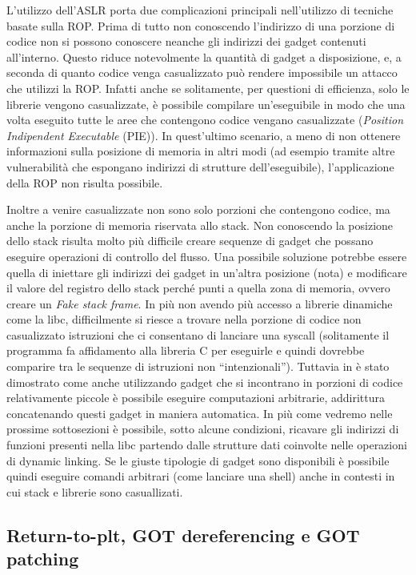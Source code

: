 L'utilizzo dell'ASLR porta due complicazioni principali nell'utilizzo
di tecniche basate sulla ROP. Prima di tutto non conoscendo
l'indirizzo di una porzione di codice non si possono conoscere neanche
gli indirizzi dei gadget contenuti all'interno. Questo riduce
notevolmente la quantità di gadget a disposizione, e, a seconda di
quanto codice venga casualizzato può rendere impossibile un attacco
che utilizzi la ROP. Infatti anche se solitamente, per questioni di
efficienza, solo le librerie vengono casualizzate, è possibile
compilare un'eseguibile in modo che una volta eseguito tutte le aree
che contengono codice vengano casualizzate (\emph{Position Indipendent
  Executable} (PIE)). In quest'ultimo scenario, a meno di non ottenere
informazioni sulla posizione di memoria in altri modi (ad esempio
tramite altre vulnerabilità che espongano indirizzi di strutture
dell'eseguibile), l'applicazione della ROP non risulta possibile.

Inoltre a venire casualizzate non sono solo porzioni che contengono
codice, ma anche la porzione di memoria riservata allo stack. Non
conoscendo la posizione dello stack risulta molto più difficile creare
sequenze di gadget che possano eseguire operazioni di controllo del
flusso. Una possibile soluzione potrebbe essere quella di iniettare
gli indirizzi dei gadget in un'altra posizione (nota) e modificare il
valore del registro dello stack perché punti a quella zona di memoria,
ovvero creare un \emph{Fake stack frame}. In più non avendo più
accesso a librerie dinamiche come la libc, difficilmente si riesce a
trovare nella porzione di codice non casualizzato istruzioni che ci
consentano di lanciare una syscall (solitamente il programma fa
affidamento alla libreria C per eseguirle e quindi dovrebbe comparire
tra le sequenze di istruzioni non ``intenzionali''). Tuttavia in
\cite{schwartz-2011} è stato dimostrato come anche utilizzando gadget che si
incontrano in porzioni di codice relativamente piccole è possibile
eseguire computazioni arbitrarie, addirittura concatenando questi
gadget in maniera automatica. In più come vedremo nelle prossime
sottosezioni è possibile, sotto alcune condizioni, ricavare gli
indirizzi di funzioni presenti nella libc partendo dalle strutture
dati coinvolte nelle operazioni di dynamic linking. Se le giuste
tipologie di gadget sono disponibili è possibile quindi eseguire
comandi arbitrari (come lanciare una shell) anche in contesti in cui
stack e librerie sono casuallizati.


\subsection{Return-to-plt, GOT dereferencing e GOT patching}

